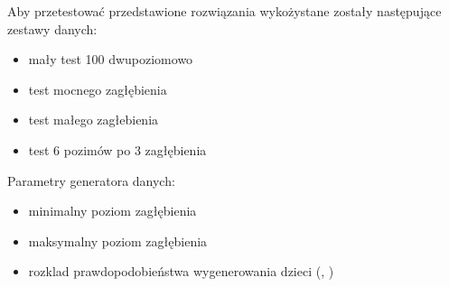Aby przetestować przedstawione rozwiązania wykożystane zostały następujące zestawy danych:
\begin{itemize}
 \item mały test 100 dwupoziomowo
 \item test mocnego zagłębienia
 \item test małego zagłebienia
 \item test 6 pozimów po 3 zagłębienia 
\end{itemize}


Parametry generatora danych:
\begin{itemize}
 \item minimalny poziom zagłębienia
 \item maksymalny poziom zagłębienia
 \item rozklad prawdopodobieństwa wygenerowania dzieci (\cite{asdf}, \cite[Ala]{asdf})
\end{itemize}
